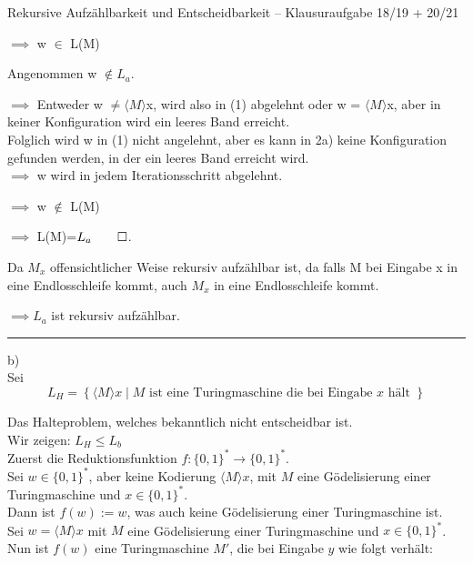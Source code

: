 \documentclass[answers]{submit}
\begin{document}
\begin{exercise}[6]{Rekursive Aufzählbarkeit und Entscheidbarkeit -- Klausuraufgabe 18/19 + 20/21}
{    $\implies$ w $\in$ L(M)

    Angenommen w $\notin L_a$.

    $\implies$ Entweder w $ \neq \langle M \rangle$x, wird also in (1) abgelehnt oder w = $ \langle M \rangle$x, aber in keiner Konfiguration wird ein leeres Band erreicht.\\

    Folglich wird w in (1) nicht angelehnt, aber es kann in 2a) keine Konfiguration gefunden werden, in der ein leeres Band erreicht wird.\\

    $\implies$ w wird in jedem Iterationsschritt abgelehnt.

    $\implies$ w $\notin$ L(M)

    $\implies$ L(M)=$L_a \qed$.

    Da $M_x$ offensichtlicher Weise rekursiv aufzählbar ist, da falls M bei Eingabe x in eine Endlosschleife kommt, auch $M_x$ in eine Endlosschleife kommt.

    $\implies L_a$ ist rekursiv aufzählbar.

    \vspace{1cm}
    \hrule

    b) \\

    Sei $$L_H=\left\{\langle M \rangle x \mid M \text{ ist eine Turingmaschine die bei Eingabe } x \text{ hält } \right\}$$

    Das Halteproblem, welches bekanntlich nicht entscheidbar ist.\\

    Wir zeigen: $L_H \leq L_b$ \\

    Zuerst die Reduktionsfunktion $f: \{0,1\}^* \rightarrow \{0,1\}^*$.\\

    Sei $w \in \{0,1\}^*$, aber keine Kodierung $ \langle M \rangle x$, mit $M$ eine Gödelisierung einer Turingmaschine und $x \in \{0,1\}^*$.\\

    Dann ist $f(w):=w$, was auch keine Gödelisierung einer Turingmaschine ist.\\

    Sei $w = \langle M \rangle x$ mit $M$ eine Gödelisierung einer Turingmaschine und $x \in \{0,1\}^*$.\\

    Nun ist $f(w)$ eine Turingmaschine $M'$, die bei Eingabe $y$ wie folgt verhält:\\

}
\end{exercise}
\end{document}
